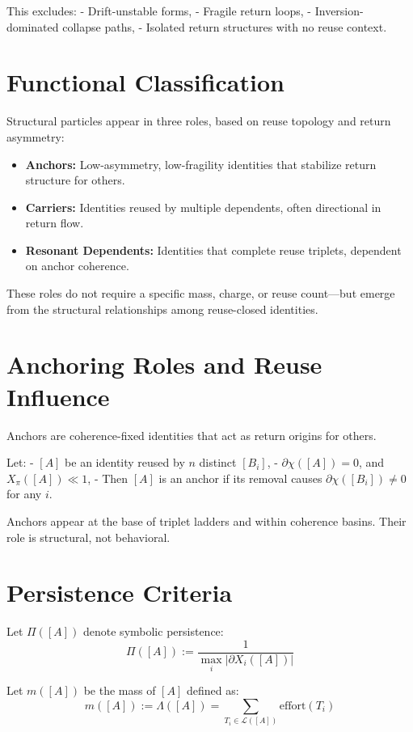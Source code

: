 This excludes:
- Drift-unstable forms,
- Fragile return loops,
- Inversion-dominated collapse paths,
- Isolated return structures with no reuse context.

\section{Functional Classification} \label{sec:particle-roles}

Structural particles appear in three roles, based on reuse topology and return asymmetry:

\begin{itemize}
  \item \textbf{Anchors:} Low-asymmetry, low-fragility identities that stabilize return structure for others.
  \item \textbf{Carriers:} Identities reused by multiple dependents, often directional in return flow.
  \item \textbf{Resonant Dependents:} Identities that complete reuse triplets, dependent on anchor coherence.
\end{itemize}

These roles do not require a specific mass, charge, or reuse count—but emerge from the structural relationships among reuse-closed identities.

\section{Anchoring Roles and Reuse Influence} \label{sec:anchoring-roles}

Anchors are coherence-fixed identities that act as return origins for others.

Let:
- $[A]$ be an identity reused by $n$ distinct $[B_i]$,
- $\partial\chi([A]) = 0$, and $X_\pi([A]) \ll 1$,
- Then $[A]$ is an anchor if its removal causes $\partial\chi([B_i]) \ne 0$ for any $i$.

Anchors appear at the base of triplet ladders and within coherence basins. Their role is structural, not behavioral.

\section{Persistence Criteria} \label{sec:persistence-criteria}

Let $\Pi([A])$ denote symbolic persistence:
\[
\Pi([A]) := \frac{1}{\max_i |\partial X_i([A])|}
\]

Let $m([A])$ be the mass of $[A]$ defined as:
\[
m([A]) := \Lambda([A]) = \sum_{T_i \in \mathcal{L}([A])} \text{effort}(T_i)
\]

